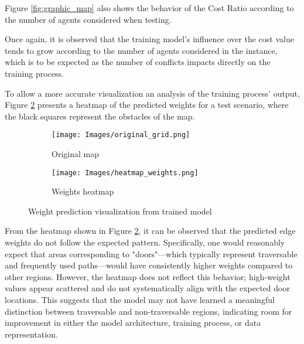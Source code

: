 Figure \ref{fig:graphic_map} also shows the behavior of the Cost Ratio according to the number of agents
considered when testing.

Once again, it is observed that the training model's influence over the cost value tends to grow according to the number of agents considered in the instance, which is to be expected as the number of conflicts impacts directly on the training process.

To allow a more accurate visualization an analysis of the training process' output, Figure \ref{fig:heatmap} presents a heatmap of the predicted weights for a test scenario, where the black squares represent the obstacles of the map.

\begin{figure}[!ht]
    \begin{subfigure}[b]{0.5\textwidth}
        \texttt{[image: Images/original\_grid.png]}
        \caption{Original map}
        \label{fig:original_map}
    \end{subfigure}
    \hspace{0.01\textwidth}
    \begin{subfigure}[b]{0.5\textwidth}
        \texttt{[image: Images/heatmap\_weights.png]}
        \caption{Weights heatmap}
        \label{fig:heatmap}
    \end{subfigure}
    \vfill
    \caption{Weight prediction visualization from trained model}
    \label{fig:weight_pred}
\end{figure}

From the heatmap shown in Figure \ref{fig:heatmap}, it can be observed that the predicted edge weights do not follow the expected pattern. Specifically, one would reasonably expect that areas corresponding to "doors"—which typically represent traversable and frequently used paths—would have consistently higher weights compared to other regions. However, the heatmap does not reflect this behavior; high-weight values appear scattered and do not systematically align with the expected door locations. This suggests that the model may not have learned a meaningful distinction between traversable and non-traversable regions, indicating room for improvement in either the model architecture, training process, or data representation.